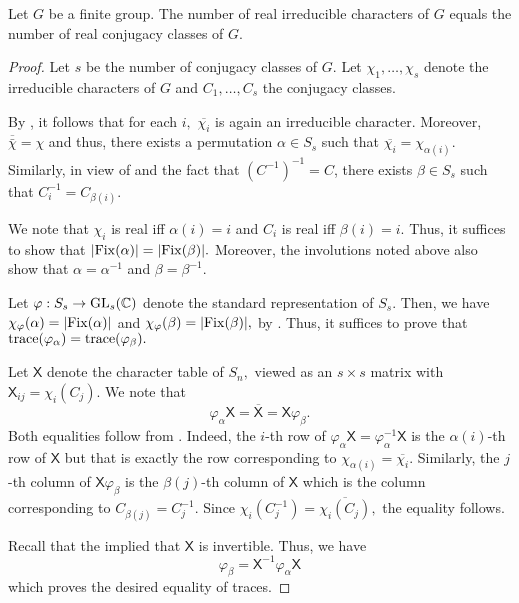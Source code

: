 \begin{thm}[Burnside] \label{thm:burnsidereal}
	Let $G$ be a finite group. The number of real irreducible characters of $G$ equals the number of real conjugacy classes of $G.$
\end{thm}
\begin{proof} 
	Let $s$ be the number of conjugacy classes of $G.$ Let $\chi_1, \ldots, \chi_s$ denote the irreducible characters of $G$ and $C_1, \ldots, C_s$ the conjugacy classes. 

	By , it follows that for each $i,$ $\overline{\chi_i}$ is again an irreducible character. Moreover, $\overline{\bar{\chi}} = \chi$ and thus, there exists a permutation $\alpha \in S_s$ such that $\overline{\chi_i} = \chi_{\alpha(i)}.$\\
	Similarly, in view of  and the fact that $(C^{-1})^{-1} = C$, there exists $\beta \in S_s$ such that $C_i^{-1} = C_{\beta(i)}.$
	
	We note that $\chi_i$ is real iff $\alpha(i) = i$ and $C_i$ is real iff $\beta(i) = i.$ Thus, it suffices to show that ${\left\lvert \operatorname{Fix}(\alpha) \right\lvert} = {\left\lvert \operatorname{Fix}(\beta) \right\lvert}.$ Moreover, the involutions noted above also show that $\alpha = \alpha^{-1}$ and $\beta = \beta^{-1}.$

	Let $\varphi : S_s \to \operatorname{GL}_s(\mathbb{C})$ denote the standard representation of $S_s.$ Then, we have $\chi_\varphi(\alpha) = {\left\lvert \operatorname{Fix}(\alpha) \right\lvert}$ and $\chi_\varphi(\beta) = {\left\lvert \operatorname{Fix}(\beta) \right\lvert},$ by . Thus, it suffices to prove that $\operatorname{trace}(\varphi_\alpha) = \operatorname{trace}(\varphi_\beta).$

	Let $\mathsf{X}$ denote the character table of $S_n,$ viewed as an $s \times s$ matrix with $\mathsf{X}_{ij} = \chi_i(C_j).$ We note that
	\begin{equation*} 
		\varphi_\alpha\mathsf{X} = \overline{\mathsf{X}} = \mathsf{X}\varphi_\beta.
	\end{equation*}
	Both equalities follow from . Indeed, the $i$-th row of $\varphi_\alpha\mathsf{X} = \varphi_\alpha^{-1}\mathsf{X}$ is the $\alpha(i)$-th row of $\mathsf{X}$ but that is exactly the row corresponding to $\chi_{\alpha(i)} = \overline{\chi_i}.$ Similarly, the $j$-th column of $\mathsf{X}\varphi_\beta$ is the $\beta(j)$-th column of $\mathsf{X}$ which is the column corresponding to $C_{\beta(j)} = C_j^{-1}.$ Since $\chi_i(C_j^{-1}) = \overline{\chi_i(C_j)},$ the equality follows.

	Recall that the  implied that $\mathsf{X}$ is invertible. Thus, we have
	\begin{equation*} 
		\varphi_\beta = \mathsf{X}^{-1}\varphi_\alpha\mathsf{X}
	\end{equation*}
	which proves the desired equality of traces.
\end{proof}

